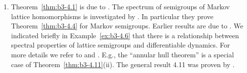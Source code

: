 \begin{enumerate}[label=\emph{Section \arabic*:}, wide]
\item
Theorem~\ref{thm:b3-4.1} is due to \citet{derndinger:1984}.
The spectrum of semigroups of Markov lattice homomorphisms is investigated by \citet{derndingernagel:1979}.
In particular they prove Theorem~\ref{thm:b3-4.4} for Markov semigroups.
Earlier results are due to \citet{scarpellini:1974}.
We indicated briefly in Example~\ref{ex:b3-4.6} that there is a relationship between spectral properties of lattice semigroups and differentiable dynamics.
For more details we refer to \citet{chiconeswanson:1981} and \citet{sackersell:1978}.
E.g., the \enquote{annular hull theorem} is a special case of Theorem~\ref{thm:b3-4.11}(ii).
The general result 4.11 was proven by \citet{arendtgreiner:1984}.

\end{enumerate}


%
 
 